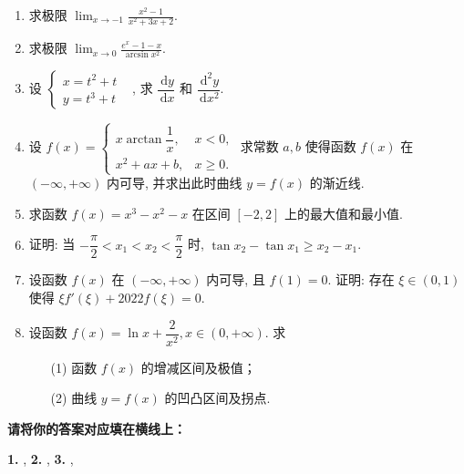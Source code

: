 \documentclass[simple]{hfutexam}
\newcommand{\diff}{\,\mathrm{d}}
\begin{document}
\begin{enumerate}
\item 求极限 $\displaystyle\lim_{x\to-1}\frac{x^2-1}{x^2+3x+2}$.
\item 求极限 $\displaystyle\lim_{x\to0}\frac{e^x-1-x}{\arcsin x^2}$.
\item 设 $\begin{cases}x=t^2+t&\\y=t^3+t&\end{cases}$, 求 $\dfrac{\diff y}{\diff x}$ 和 $\dfrac{\diff^2 y}{\diff x^2}$.
\item 设 $f(x)=\begin{cases}x\arctan\dfrac1x,&x<0,\\x^2+ax+b,&x\ge0.\end{cases}$
求常数 $a,b$ 使得函数 $f(x)$ 在 $(-\infty,+\infty)$ 内可导, 并求出此时曲线 $y=f(x)$ 的渐近线.
\item	求函数 $f(x)=x^3-x^2-x$ 在区间 $[-2,2]$ 上的最大值和最小值.
\item 证明: 当 $-\dfrac\pi2<x_1<x_2<\dfrac\pi2$ 时, $\tan x_2-\tan x_1\ge x_2-x_1$.
\item 设函数 $f(x)$ 在 $(-\infty,+\infty)$ 内可导, 且 $f(1)=0$.
证明: 存在 $\xi\in(0,1)$ 使得 $\xi f'(\xi)+2022f(\xi)=0$.
\item 设函数 $f(x)=\ln x+\dfrac2{x^2}, x\in(0,+\infty)$. 求
\begin{enumerate}
\item[(1)] 函数 $f(x)$ 的增减区间及极值；
\item[(2)] 曲线 $y=f(x)$ 的凹凸区间及拐点.
\end{enumerate}
\end{enumerate}

\newpage
{}
\maketitle


\textbf{请将你的答案对应填在横线上：}

\vspace{\baselineskip}
\textbf{1.} , 
\textbf{2.} \fillblank{3.5cm}{1cm}{$2x\cos(x^2+1)\diff x$}, 
\textbf{3.} , 
\end{document}
